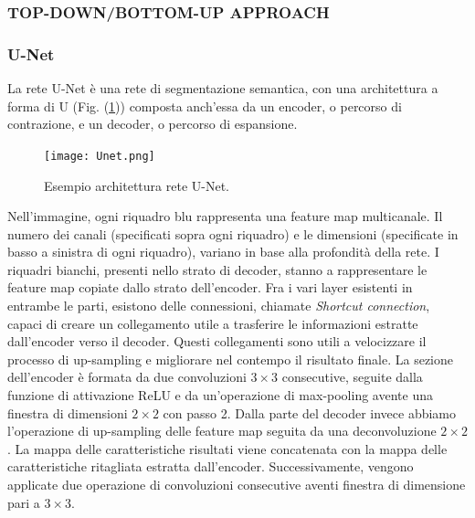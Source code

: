 \subsubsection{TOP-DOWN/BOTTOM-UP APPROACH}
\subsubsection{U-Net}
La rete U-Net \cite{unet} è una rete di segmentazione semantica, con una architettura a forma 
di U (Fig. (\ref{unet})) composta anch’essa da un encoder, o percorso di contrazione, e 
un decoder, o percorso di espansione.
\begin{figure}
    \centering
    \texttt{[image: Unet.png]}
    \centering
    \caption{Esempio architettura rete U-Net.}
    \label{unet}
\end{figure}
Nell’immagine, ogni riquadro blu rappresenta una feature map multicanale. Il 
numero dei canali (specificati sopra ogni riquadro) e le dimensioni (specificate in 
basso a sinistra di ogni riquadro), variano in base alla profondità della rete. I 
riquadri bianchi, presenti nello strato di decoder, stanno a rappresentare le feature 
map copiate dallo strato dell’encoder. Fra i vari layer esistenti in entrambe le 
parti, esistono delle connessioni, chiamate \emph{Shortcut connection}, capaci di creare 
un collegamento utile a trasferire le informazioni estratte dall’encoder verso il 
decoder. Questi collegamenti sono utili a velocizzare il processo di up-sampling e 
migliorare nel contempo il risultato finale. La sezione dell’encoder è formata da 
due convoluzioni $3 \times 3$ consecutive, seguite dalla funzione di attivazione ReLU e 
da un’operazione di max-pooling avente una finestra di dimensioni $2 \times 2$ con 
passo 2. Dalla parte del decoder invece abbiamo l’operazione di up-sampling delle 
feature map seguita da una deconvoluzione $2 \times 2$. La mappa delle caratteristiche 
risultati viene concatenata con la mappa delle caratteristiche ritagliata estratta 
dall’encoder. Successivamente, vengono applicate due operazione di convoluzioni 
consecutive aventi finestra di dimensione pari a $3 \times 3$.

